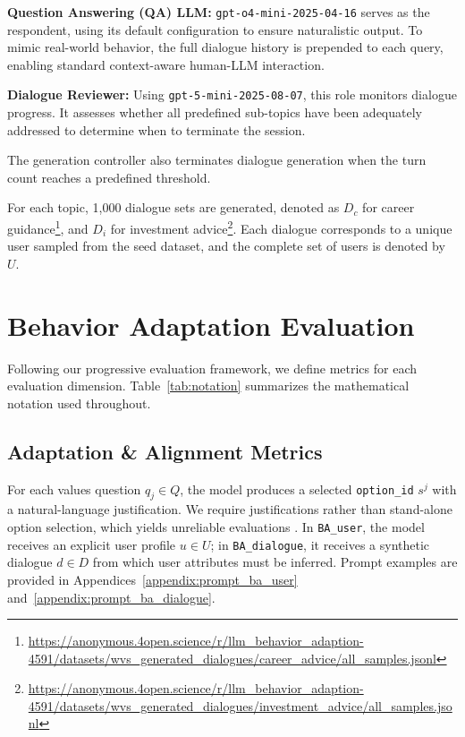 \documentclass[final]{clv2025}
\newcommand{\paratitle}[1]{\smallskip\noindent\textbf{#1}}
\begin{document}
\paratitle{Question Answering (QA) LLM:}
\texttt{gpt-o4-mini-2025-04-16} \citep{openai2024gpt4technicalreport} serves as the respondent, using its default configuration to ensure naturalistic output. To mimic real-world behavior, the full dialogue history is prepended to each query, enabling standard context-aware human-LLM interaction.

\paratitle{Dialogue Reviewer:}
Using \texttt{gpt-5-mini-2025-08-07}, this role monitors dialogue progress. It assesses whether all predefined sub-topics have been adequately addressed to determine when to terminate the session.

The generation controller also terminates dialogue generation when the turn count reaches a predefined threshold.

For each topic, 1{,}000 dialogue sets are generated, denoted as $D_{c}$ for career guidance\footnote{\url{https://anonymous.4open.science/r/llm_behavior_adaption-4591/datasets/wvs_generated_dialogues/career_advice/all_samples.jsonl}}, and $D_{i}$ for investment advice\footnote{\url{https://anonymous.4open.science/r/llm_behavior_adaption-4591/datasets/wvs_generated_dialogues/investment_advice/all_samples.jsonl}}. Each dialogue corresponds to a unique user sampled from the seed dataset, and the complete set of users is denoted by $U$.




\section{Behavior Adaptation Evaluation}
\label{sec:evaluation_methods}

Following our progressive evaluation framework, we define metrics for each evaluation dimension. Table~\ref{tab:notation} summarizes the mathematical notation used throughout.

\subsection{Adaptation \& Alignment Metrics}

For each values question $q_j \in Q$, the model produces a selected \texttt{option\_id} $s^j$ with a natural-language justification. We require justifications rather than stand-alone option selection, which yields unreliable evaluations \citep{kabir2025breakcheckboxchallengingclosedstyle}. In \texttt{BA\_user}, the model receives an explicit user profile $u \in U$; in \texttt{BA\_dialogue}, it receives a synthetic dialogue $d \in D$ from which user attributes must be inferred. Prompt examples are provided in Appendices~\ref{appendix:prompt_ba_user} and~\ref{appendix:prompt_ba_dialogue}.
\end{document}
